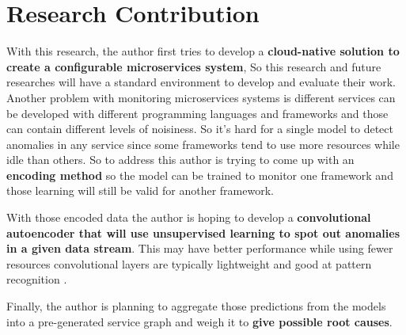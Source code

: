 
{\let\clearpage\relax\chapter{Research Contribution}}

With this research, the author first tries to develop a \textbf{cloud-native solution to create a configurable microservices system}, So this research and future researches will have a standard environment to develop and evaluate their work.
\label{need-for-encoding}
Another problem with monitoring microservices systems is different services can be developed with different programming languages and frameworks and those can contain different levels of noisiness. So it's hard for a single model to detect anomalies in any service since some frameworks tend to use more resources while idle than others.  So to address this author is trying to come up with an \textbf{encoding method} so the model can be trained to monitor one framework and those learning will still be valid for another framework.

With those encoded data the author is hoping to develop a \textbf{convolutional autoencoder that will use unsupervised learning to spot out anomalies in a given data stream}. This may have better performance while using fewer resources convolutional layers are typically lightweight and good at pattern recognition \citep{oord2016wavenet}.

Finally, the author is planning to aggregate those predictions from the models into a pre-generated service graph and weigh it to \textbf{give possible root causes}.
